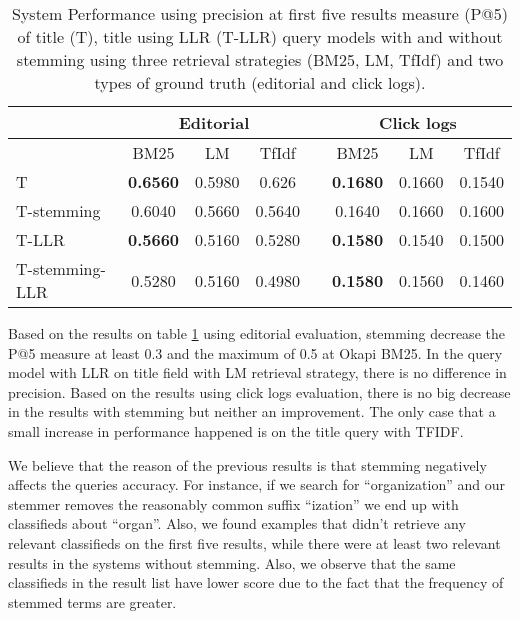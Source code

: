 \begin{table}[H]
\begin{center}
\caption{System Performance using precision at first five results measure (P@5) of title (T), title using LLR (T-LLR) query models with and without stemming using three retrieval strategies (BM25, LM, TfIdf) and two types of ground truth (editorial and click logs).}
\label{table:stemmSystems}
\begin{tabular}{lccccccc}
\toprule
 & \multicolumn{3}{c}{Editorial} & & \multicolumn{3}{c}{Click logs} \\
\midrule
 & BM25 & LM & TfIdf &   & BM25 & LM & TfIdf \\
\midrule
T &  \textbf{0.6560} &  0.5980 & 0.626 &   &            \textbf{0.1680} & 0.1660 & 0.1540 \\
T-stemming 	& 0.6040 & 0.5660 & 0.5640 &   &	 		0.1640 & 0.1660 & 0.1600 \\
T-LLR & \textbf{0.5660} & 0.5160 & 0.5280 &   &	 		\textbf{0.1580} & 0.1540 & 0.1500 \\
T-stemming-LLR & 0.5280 & 0.5160 & 0.4980 &   &	 		\textbf{0.1580} & 0.1560 & 0.1460 \\
\bottomrule
\end{tabular}
\end{center}
\end{table}




Based on the results on table \ref{table:stemmSystems} using editorial evaluation, stemming decrease the P@5 measure at least 0.3 and the maximum of 0.5 at Okapi BM25. In the query model with LLR on title field with LM retrieval strategy, there is no difference in precision.
Based on the results using click logs evaluation, there is no big decrease in the results with stemming but neither an improvement. The only case that a small increase in performance happened is on the title query with TFIDF.

We believe that the reason of the previous results is that stemming negatively affects the queries accuracy. For instance, if we search for ``organization'' and our stemmer removes the reasonably common suffix ``ization'' we end up with classifieds about ``organ''. Also, we found examples that didn't retrieve any relevant classifieds on the first five results, while there were at least two relevant results in the systems without stemming. Also, we observe that the same classifieds in the result list have lower score due to the fact that the frequency of stemmed terms are greater.

